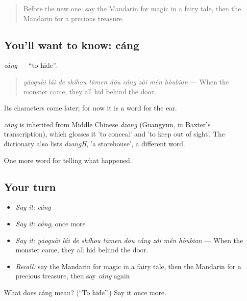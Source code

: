 \label{lesson:ZH-C331-cang}



\begin{quote}
Before the new one: say the Mandarin for magic in a fairy tale, then the Mandarin for a precious treasure.
\end{quote}

\subsection*{You'll want to know: cáng}
\emph{cáng} — \textquotedblleft{}to hide\textquotedblright{}.

\begin{quote}
\emph{yāoguài lái de shíhou tāmen dōu cáng zài mén hòubian} — When the monster came, they all hid behind the door.
\end{quote}

Its characters come later; for now it is a word for the ear.

\begin{cousinweb}
\emph{cáng} is inherited from Middle Chinese \emph{dzang} (Guangyun, in Baxter's transcription), which glosses it 'to conceal' and 'to keep out of sight'. The dictionary also lists \emph{dzangH}, 'a storehouse', a different word.
\end{cousinweb}

\begin{grammarlens}[title={What you've built}]
One more word for telling what happened.
\end{grammarlens}

\subsection*{Your turn}
\begin{itemize}
\raggedright
  \item \emph{Say it:} \emph{cáng}
  \item \emph{Say it:} \emph{cáng}, once more
  \item \emph{Say it:} \emph{yāoguài lái de shíhou tāmen dōu cáng zài mén hòubian} — When the monster came, they all hid behind the door.
  \item \emph{Recall:} say the Mandarin for magic in a fairy tale, then the Mandarin for a precious treasure, then say \emph{cáng} again
\end{itemize}

\begin{tcolorbox}[breakable,colback=teal!4,colframe=teal!35!black,title={Before you move on}]
What does cáng mean? (\textquotedblleft{}To hide\textquotedblright{}.) Say it once more.
\end{tcolorbox}

